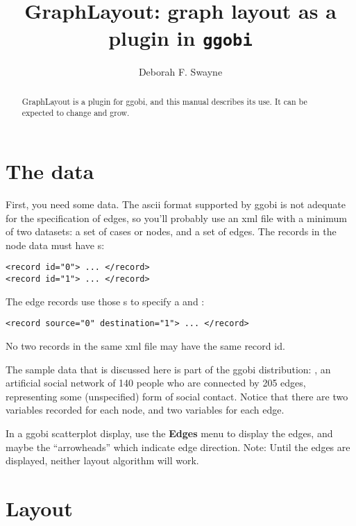 \documentclass[11pt]{article}
\begin{document}
\title{GraphLayout: graph layout as a plugin in {\tt ggobi}}
\author{Deborah F. Swayne}
\maketitle

\begin{abstract}
GraphLayout is a plugin for ggobi, and this manual
describes its use.  It can be expected to change and grow.
\end{abstract}

\section{The data}

First, you need some data.  The ascii format supported by ggobi is not
adequate for the specification of edges, so you'll probably use an xml
file with a minimum of two datasets:  a set of cases or nodes, and a set
of edges.  The records in the node data must have
s:

\begin{verbatim}
<record id="0"> ... </record>
<record id="1"> ... </record>
\end{verbatim}

The edge records use those s to specify a
 and :

\begin{verbatim}
<record source="0" destination="1"> ... </record>
\end{verbatim}

No two records in the same xml file may have the same record id.

The sample data that is discussed here is part of the ggobi distribution:
, an artificial social network of 140 people who are
connected by 205 edges, representing some (unspecified) form of social
contact.  Notice that there are two variables recorded for each node,
and two variables for each edge.

In a ggobi scatterplot display, use the {\bf Edges} menu to
display the edges, and maybe the ``arrowheads'' which indicate
edge direction.  Note: Until the edges are displayed, neither layout
algorithm will work.

\section{Layout}
\end{document}
